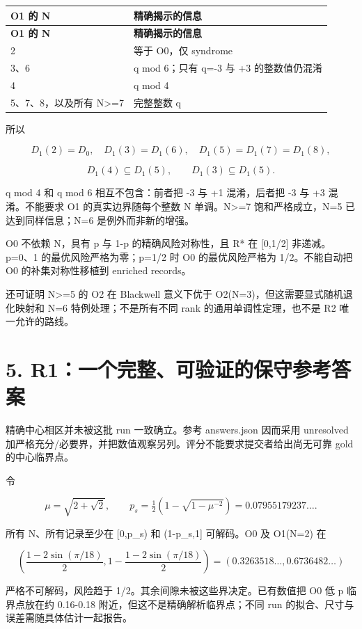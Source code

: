 \documentclass[11pt,a4paper]{article}
\begin{document}
{\fontsize{9}{12.5}\selectfont
\setlength{\tabcolsep}{2.2pt}

\begin{longtable}{>{\raggedright\arraybackslash}p{}>{\raggedright\arraybackslash}p{}}
\toprule
\textbf{O1 的 N} & \textbf{精确揭示的信息}\tabularnewline
\midrule
\endfirsthead
\toprule
\textbf{O1 的 N} & \textbf{精确揭示的信息}\tabularnewline
\midrule
\endhead
{}2 & 等于 O0，仅 syndrome\tabularnewline
{}3、6 & q mod 6；只有 q=-3 与 +3 的整数值仍混淆\tabularnewline
{}4 & q mod 4\tabularnewline
{}5、7、8，以及所有 N>=7 & 完整整数 q\tabularnewline
\bottomrule
\end{longtable}
}

所以

\[
D_1(2)=D_0,\quad D_1(3)=D_1(6),\quad
D_1(5)=D_1(7)=D_1(8),
\]

\[
D_1(4)\subseteq D_1(5),\qquad
D_1(3)\subseteq D_1(5).
\]

q mod 4 和 q mod 6 相互不包含：前者把 -3 与 +1 混淆，后者把 -3 与 +3 混淆。不能要求 O1 的真实边界随每个整数 N 单调。N>=7 饱和严格成立，N=5 已达到同样信息；N=6 是例外而非新的增强。

O0 不依赖 N，具有 p 与 1-p 的精确风险对称性，且 R* 在 [0,1/2] 非递减。p=0、1 的最优风险严格为零；p=1/2 时 O0 的最优风险严格为 1/2。不能自动把 O0 的补集对称性移植到 enriched records。

还可证明 N>=5 的 O2 在 Blackwell 意义下优于 O2(N=3)，但这需要显式随机退化映射和 N=6 特例处理；不是所有不同 rank 的通用单调性定理，也不是 R2 唯一允许的路线。

\section*{5. R1：一个完整、可验证的保守参考答案}

精确中心相区并未被这批 run 一致确立。参考 answers.json 因而采用 unresolved 加严格充分/必要界，并把数值观察另列。评分不能要求提交者给出尚无可靠 gold 的中心临界点。

令

\[
\mu=\sqrt{2+\sqrt2},\qquad
p_s=\tfrac12(1-\sqrt{1-\mu^{-2}})=0.07955179237\ldots.
\]

所有 N、所有记录至少在 [0,p\_s) 和 (1-p\_s,1] 可解码。O0 及 O1(N=2) 在

\[
\left(\frac{1-2\sin(\pi/18)}2,
1-\frac{1-2\sin(\pi/18)}2\right)
=(0.3263518\ldots,0.6736482\ldots)
\]

严格不可解码，风险趋于 1/2。其余间隙未被这些界决定。已有数值把 O0 低 p 临界点放在约 0.16-0.18 附近，但这不是精确解析临界点；不同 run 的拟合、尺寸与误差需随具体估计一起报告。
\end{document}
